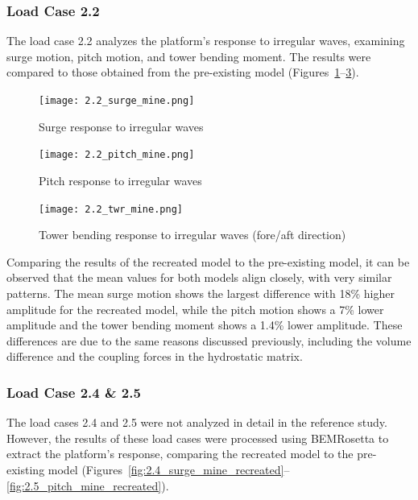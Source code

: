 \documentclass[a4paper, 11pt]{article}
\begin{document}
\subsubsection{Load Case 2.2}
\hspace*{0.5cm}The load case 2.2 analyzes the platform's response to irregular waves, examining surge motion, pitch motion, and tower bending moment. The results were compared to those obtained from the pre-existing model (Figures~\ref{fig:2.2_surge_mine}--\ref{fig:2.2_twr_mine}). 

\begin{figure}[H]
    \centering
    \texttt{[image: 2.2\_surge\_mine.png]}
    \caption{\small Surge response to irregular waves}
    \label{fig:2.2_surge_mine}
\end{figure}

\begin{figure}[H]
    \centering
    \texttt{[image: 2.2\_pitch\_mine.png]}
    \caption{\small Pitch response to irregular waves}
    \label{fig:2.2_pitch_mine}
\end{figure}

\begin{figure}[H]
    \centering
    \texttt{[image: 2.2\_twr\_mine.png]}
    \caption{\small Tower bending response to irregular waves (fore/aft direction)}
    \label{fig:2.2_twr_mine}
\end{figure}

Comparing the results of the recreated model to the pre-existing model, it can be observed that the mean values for both models align closely, with very similar patterns. The mean surge motion shows the largest difference with 18\% higher amplitude for the recreated model, while the pitch motion shows a 7\% lower amplitude and the tower bending moment shows a 1.4\% lower amplitude. These differences are due to the same reasons discussed previously, including the volume difference and the coupling forces in the hydrostatic matrix.

\subsubsection{Load Case 2.4 \& 2.5}

\hspace*{0.5cm}The load cases 2.4 and 2.5 were not analyzed in detail in the reference study. However, the results of these load cases were processed using BEMRosetta to extract the platform's response, comparing the recreated model to the pre-existing model (Figures~\ref{fig:2.4_surge_mine_recreated}--\ref{fig:2.5_pitch_mine_recreated}).
\end{document}
